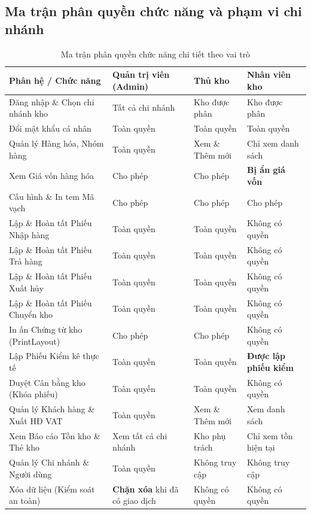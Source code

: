 \documentclass[12pt,a4paper]{report}
\renewcommand{\_}{\textunderscore\allowbreak}
\begin{document}
\subsection{Ma trận phân quyền chức năng và phạm vi chi nhánh}
\begin{table}[H]
\centering
\small
\setlength{\tabcolsep}{4pt}
\renewcommand{\arraystretch}{1.18}
\begin{tabularx}{\textwidth}{|>{\raggedright\arraybackslash}p{5.2cm}|Z|Z|Z|}
\hline
{}
\textbf{Phân hệ / Chức năng} & \textbf{Quản trị viên (Admin)} & \textbf{Thủ kho} & \textbf{Nhân viên kho} \\
\hline
Đăng nhập \& Chọn chi nhánh kho & Tất cả chi nhánh & Kho được phân & Kho được phân \\
\hline
Đổi mật khẩu cá nhân & Toàn quyền & Toàn quyền & Toàn quyền \\
\hline
Quản lý Hàng hóa, Nhóm hàng & Toàn quyền & Xem \& Thêm mới & Chỉ xem danh sách \\
\hline
Xem Giá vốn hàng hóa & Cho phép & Cho phép & \textbf{Bị ẩn giá vốn} \\
\hline
Cấu hình \& In tem Mã vạch & Cho phép & Cho phép & Cho phép \\
\hline
Lập \& Hoàn tất Phiếu Nhập hàng & Toàn quyền & Toàn quyền & Không có quyền \\
\hline
Lập \& Hoàn tất Phiếu Trả hàng & Toàn quyền & Toàn quyền & Không có quyền \\
\hline
Lập \& Hoàn tất Phiếu Xuất hủy & Toàn quyền & Toàn quyền & Không có quyền \\
\hline
Lập \& Hoàn tất Phiếu Chuyển kho & Toàn quyền & Toàn quyền & Không có quyền \\
\hline
In ấn Chứng từ kho (\_PrintLayout) & Cho phép & Cho phép & Không có quyền \\
\hline
Lập Phiếu Kiểm kê thực tế & Toàn quyền & Toàn quyền & \textbf{Được lập} \newline \textbf{phiếu kiểm} \\
\hline
Duyệt Cân bằng kho (Khóa phiếu) & Toàn quyền & Toàn quyền & Không có quyền \\
\hline
Quản lý Khách hàng \& Xuất HĐ VAT & Toàn quyền & Xem \& Thêm mới & Xem danh sách \\
\hline
Xem Báo cáo Tồn kho \& Thẻ kho & Xem tất cả \newline chi nhánh & Kho phụ trách & Chỉ xem \newline tồn hiện tại \\
\hline
Quản lý Chi nhánh \& Người dùng & Toàn quyền & Không truy cập & Không truy cập \\
\hline
Xóa dữ liệu (Kiểm soát an toàn) & \textbf{Chặn xóa} khi \newline đã có giao dịch & Không có quyền & Không có quyền \\
\hline
\end{tabularx}
\caption{Ma trận phân quyền chức năng chi tiết theo vai trò}
\label{tab:ma_tran_quyen}
\end{table}
\end{document}

